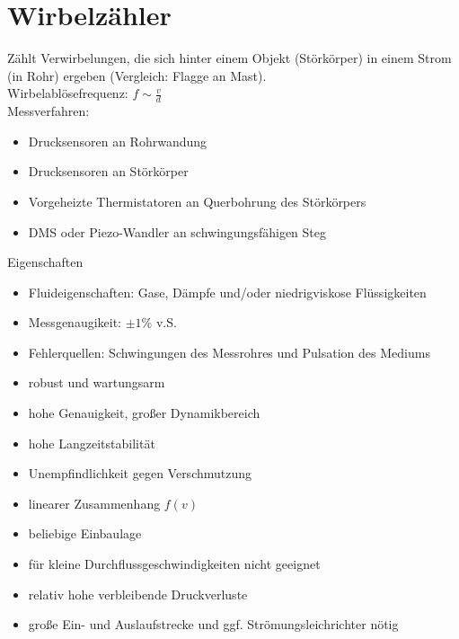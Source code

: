 \documentclass{scrreprt}
\begin{document}
\section{Wirbelzähler}
Zählt Verwirbelungen, die sich hinter einem Objekt (Störkörper) in einem Strom (in Rohr) ergeben (Vergleich: Flagge an Mast).\\
Wirbelablösefrequenz: $f \sim \frac{v}{d}$\\
Messverfahren:
\begin{itemize}
\item Drucksensoren an Rohrwandung
\item Drucksensoren an Störkörper
\item Vorgeheizte Thermistatoren an Querbohrung des Störkörpers
\item DMS oder Piezo-Wandler an schwingungsfähigen Steg
\end{itemize}
Eigenschaften
\begin{itemize}
\item Fluideigenschaften: Gase, Dämpfe und/oder niedrigviskose Flüssigkeiten
\item Messgenaugikeit: $\pm 1 \%$ v.S.
\item Fehlerquellen: Schwingungen des Messrohres und Pulsation des Mediums
\end{itemize}
\begin{itemize}[label=$+$]
\item robust und wartungsarm
\item hohe Genauigkeit, großer Dynamikbereich
\item hohe Langzeitstabilität
\item Unempfindlichkeit gegen Verschmutzung
\item linearer Zusammenhang $f(v)$
\item beliebige Einbaulage
\end{itemize}
\begin{itemize}[label=$-$]
\item für kleine Durchflussgeschwindigkeiten nicht geeignet
\item relativ hohe verbleibende Druckverluste
\item große Ein- und Auslaufstrecke und ggf. Strömungsleichrichter nötig
\end{itemize}
\end{document}
